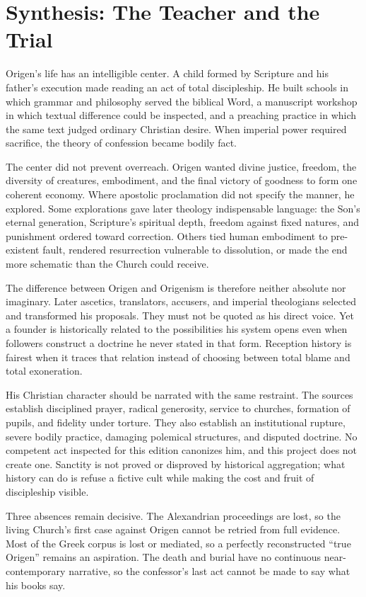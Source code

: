 \section{Synthesis: The Teacher and the Trial}
\label{sec:origen-synthesis}

Origen's life has an intelligible center. A child formed by Scripture and his
father's execution made reading an act of total discipleship. He built schools
in which grammar and philosophy served the biblical Word, a manuscript workshop
in which textual difference could be inspected, and a preaching practice in
which the same text judged ordinary Christian desire. When imperial power
required sacrifice, the theory of confession became bodily fact.

The center did not prevent overreach. Origen wanted divine justice, freedom,
the diversity of creatures, embodiment, and the final victory of goodness to
form one coherent economy. Where apostolic proclamation did not specify the
manner, he explored. Some explorations gave later theology indispensable
language: the Son's eternal generation, Scripture's spiritual depth, freedom
against fixed natures, and punishment ordered toward correction. Others tied
human embodiment to pre-existent fault, rendered resurrection vulnerable to
dissolution, or made the end more schematic than the Church could receive.

The difference between Origen and Origenism is therefore neither absolute nor
imaginary. Later ascetics, translators, accusers, and imperial theologians
selected and transformed his proposals. They must not be quoted as his direct
voice. Yet a founder is historically related to the possibilities his system
opens even when followers construct a doctrine he never stated in that form.
Reception history is fairest when it traces that relation instead of choosing
between total blame and total exoneration.

His Christian character should be narrated with the same restraint. The
sources establish disciplined prayer, radical generosity, service to churches,
formation of pupils, and fidelity under torture. They also establish an
institutional rupture, severe bodily practice, damaging polemical structures,
and disputed doctrine. No competent act inspected for this edition canonizes
him, and this project does not create one. Sanctity is not proved or disproved
by historical aggregation; what history can do is refuse a fictive cult while
making the cost and fruit of discipleship visible.

Three absences remain decisive. The Alexandrian proceedings are lost, so the
living Church's first case against Origen cannot be retried from full evidence.
Most of the Greek corpus is lost or mediated, so a perfectly reconstructed
``true Origen'' remains an aspiration. The death and burial have no continuous
near-contemporary narrative, so the confessor's last act cannot be made to say
what his books say.

